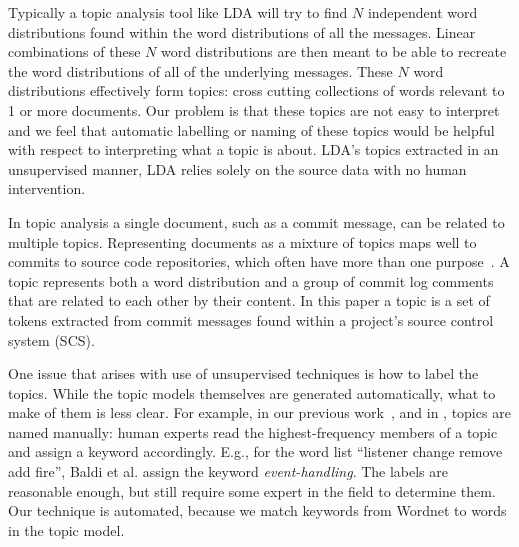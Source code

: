 \documentclass{acm_proc_article-sp}
\begin{document}
Typically a topic analysis tool like LDA will try to find $N$ independent word distributions found within the word distributions of all the messages. Linear combinations of these $N$ word distributions are then meant to be able to recreate the word distributions of all of the underlying messages. These $N$ word distributions effectively form topics: cross cutting collections of words relevant to 1 or more documents. Our problem is that these topics are not easy to interpret and we feel that automatic labelling or naming of these topics would be helpful with respect to interpreting what a topic is about. LDA's topics extracted in an unsupervised manner, LDA relies solely on the source data with no human intervention.

In topic analysis a single document, such as a commit message, can be related to multiple topics. Representing documents as a mixture of topics maps well to commits to source code repositories, which often have more than one purpose~\cite{Hindle09ICSM}.  A topic represents both a word distribution and a group of commit log comments that are related to each other by their content.  In this paper a topic is a set of tokens extracted from commit messages found within a project's source control system (SCS).

One issue that arises with use of unsupervised techniques is how to label the topics. While the topic models themselves are generated automatically, what to make of them is less clear. For example, in our previous work~\cite{Hindle09ICSM}, and in \cite{Baldi2008}, topics are named manually: human experts read the highest-frequency members of a topic and assign a keyword accordingly. E.g., for the word list ``listener change remove add fire'', Baldi et al. assign the keyword \emph{event-handling}. The labels are reasonable enough, but still require some expert in the field to determine them. Our technique is automated, because we match keywords from Wordnet to words in the topic model. 
\end{document}
